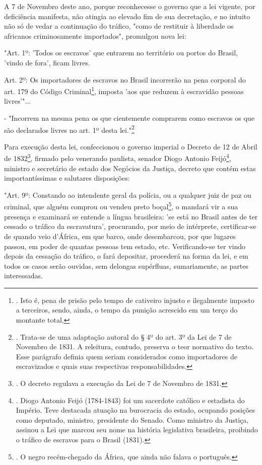 A 7 de Novembro deste ano, porque reconhecesse o governo que a lei
vigente, por deficiência manifesta, não atingia ao elevado fim de sua
decretação, e no intuito não só de vedar a continuação do tráfico, "como
de restituir à liberdade os africanos criminosamente importados",
promulgou nova lei:

"Art. 1º: 'Todos os escravos' que entrarem no território ou portos do
Brasil, 'vindo de fora', ficam livres.

Art. 2º: Os importadores de escravos no Brasil incorrerão na pena
corporal do art. 179 do Código Criminal\footnote{. Isto é, pena de
  prisão pelo tempo de cativeiro injusto e ilegalmente imposto a
  terceiros, sendo, ainda, o tempo da punição acrescido em um terço do
  montante total.}, imposta 'aos que reduzem à escravidão pessoas
livres'"...

- "Incorrem na mesma pena os que cientemente comprarem como escravos os
que são declarados livres no art. 1º desta lei."\footnote{. Trata-se de
  uma adaptação autoral do § 4º do art. 3º da Lei de 7 de Novembro de
  1831. A releitura, contudo, preserva o teor normativo do texto. Esse
  parágrafo definia quem seriam considerados como importadores de
  escravizados e quais suas respectivas responsabilidades.}

Para execução desta lei, confeccionou o governo imperial o Decreto de 12
de Abril de 1832\footnote{. O decreto regulava a execução da Lei de 7 de
  Novembro de 1831.}, firmado pelo venerando paulista, senador Diogo
Antonio Feijó\footnote{. Diogo Antonio Feijó (1784-1843) foi um
  sacerdote católico e estadista do Império. Teve destacada atuação na
  burocracia do estado, ocupando posições como deputado, ministro,
  presidente do Senado. Como ministro da Justiça, assinou a Lei que
  marcou seu nome na história legislativa brasileira, proibindo o
  tráfico de escravos para o Brasil (1831).}, ministro e secretário de
estado dos Negócios da Justiça, decreto que contém estas
importantíssimas e salutares disposições:

"Art. 9º: Constando ao intendente geral da polícia, ou a qualquer juiz
de paz ou criminal, que alguém comprou ou vendeu preto boçal\footnote{.
  O negro recém-chegado da África, que ainda não falava o português.}, o
mandará vir a sua presença e examinará se entende a língua brasileira:
'se está no Brasil antes de ter cessado o tráfico da escravatura',
procurando, por meio de intérprete, certificar-se de quando veio
d'África, em que barco, onde desembarcou, por que lugares passou, em
poder de quantas pessoas tem estado, etc. Verificando-se ter vindo
depois da cessação do tráfico, o fará depositar, procederá na forma da
lei, e em todos os casos serão ouvidas, sem delongas supérfluas,
sumariamente, as partes interessadas.

